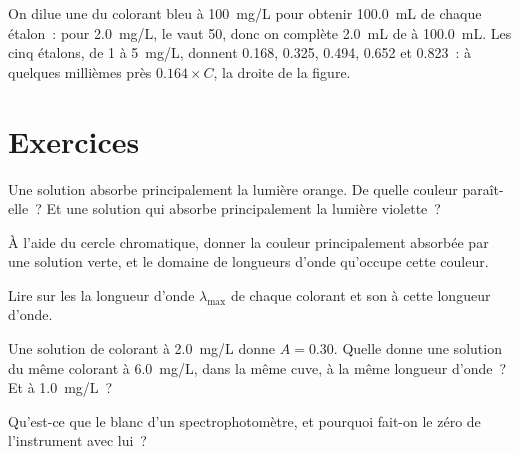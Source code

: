 \begin{example}\label{ex:g11:absorbance:standards}
On dilue une  du colorant bleu à \qty{100}{mg/L} pour
obtenir \qty{100.0}{mL} de chaque étalon~: pour \qty{2.0}{mg/L}, le
 vaut 50, donc on complète \qty{2.0}{mL} de  à \qty{100.0}{mL}. Les cinq étalons, de 1 à \qty{5}{mg/L}, donnent
0.168, 0.325, 0.494, 0.652 et 0.823~: à quelques millièmes près
$0.164 \times C$, la droite de la figure.
\end{example}

\section{Exercices}

\begin{exercise}[$\star$]\label{exo:g11:absorbance:1}
Une solution absorbe principalement la lumière orange. De quelle couleur
paraît-elle~? Et une solution qui absorbe principalement la lumière
violette~?
\end{exercise}

\begin{exercise}[$\star$]\label{exo:g11:absorbance:2}
À l'aide du cercle chromatique, donner la couleur principalement
absorbée par une solution verte, et le domaine de longueurs d'onde
qu'occupe cette couleur.
\end{exercise}

\begin{exercise}[$\star$]\label{exo:g11:absorbance:3}
Lire sur les  la longueur d'onde $\lambda_{\max}$
de chaque colorant et son  à cette longueur d'onde.
\end{exercise}

\begin{exercise}[$\star$]\label{exo:g11:absorbance:4}
Une solution de colorant à \qty{2.0}{mg/L} donne $A = 0.30$. Quelle
 donne une solution du même colorant à \qty{6.0}{mg/L}, dans la
même cuve, à la même longueur d'onde~? Et à \qty{1.0}{mg/L}~?
\end{exercise}

\begin{exercise}[$\star$]\label{exo:g11:absorbance:5}
Qu'est-ce que le blanc d'un spectrophotomètre, et pourquoi fait-on le
zéro de l'instrument avec lui~?
\end{exercise}

